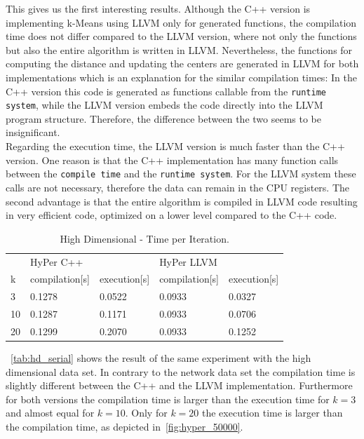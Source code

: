 This gives us the first interesting results. Although the C++ version is implementing k-Means using LLVM only for generated functions, the compilation time does not differ compared to the LLVM version, where not only the functions but also the entire algorithm is written in LLVM. Nevertheless, the functions for computing the distance and updating the centers are generated in LLVM for both implementations which is an explanation for the similar compilation times: In the C++ version this code is generated as functions callable from the \texttt{runtime system}, while the LLVM version embeds the code directly into the LLVM program structure. Therefore, the difference between the two seems to be insignificant.
\\
Regarding the execution time, the LLVM version is much faster than the C++ version. One reason is that the C++ implementation has many function calls between the \texttt{compile time} and the \texttt{runtime system}. For the LLVM system these calls are not necessary, therefore the data can remain in the CPU registers. The second advantage is that the entire algorithm is compiled in LLVM code resulting in very efficient code, optimized on a lower level compared to the C++ code.


\begin{table}[htsb]
  \caption[High Dimensional - Time per Iteration (Serial)]{High Dimensional - Time per Iteration.}\label{tab:hd_serial}
  \centering
  \begin{tabular}{l l l l l}
    \toprule
      & HyPer C++ & & HyPer LLVM & \\
      k & compilation[s] & execution[s] & compilation[s] & execution[s] \\
    \midrule
      3  & 0.1278 & 0.0522 & 0.0933 & 0.0327 \\
      10 & 0.1287 & 0.1171 & 0.0933 & 0.0706 \\
      20 & 0.1299 & 0.2070 & 0.0933 & 0.1252 \\
    \bottomrule
  \end{tabular}
\end{table}

~\autoref{tab:hd_serial} shows the result of the same experiment with the high dimensional data set. In contrary to the network data set the compilation time is slightly different between the C++ and the LLVM implementation. Furthermore for both versions the compilation time is larger than the execution time for $k = 3$ and almost equal for $k = 10$. Only for $k = 20$ the execution time is larger than the compilation time, as depicted in~\autoref{fig:hyper_50000}.

